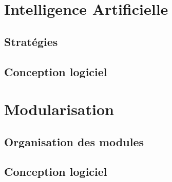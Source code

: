\documentclass[a4paper,12pt]{article}
\begin{document}


\section{Intelligence Artificielle}

\subsection{Stratégies}

\clearpage
\subsection{Conception logiciel}




\section{Modularisation}
\label{sec:module}

\subsection{Organisation des modules}

\clearpage
\subsection{Conception logiciel}


%
\end{document}
